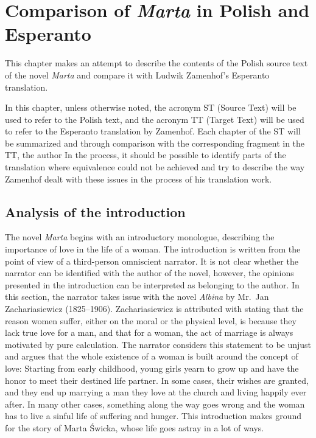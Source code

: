 \chapter{Comparison of \textit{Marta} in Polish and Esperanto}

This chapter makes an attempt to describe the contents of the Polish source text of the novel \textit{Marta} and compare it with Ludwik Zamenhof's Esperanto translation.

In this chapter, unless otherwise noted, the acronym ST (Source Text) will be used to refer to the Polish text, and the acronym TT (Target Text) will be used to refer to the Esperanto translation by Zamenhof.
Each chapter of the ST will be summarized and through comparison with the corresponding fragment in the TT, the author
In the process, it should be possible to identify parts of the translation where equivalence could not be achieved and try to describe the way Zamenhof dealt with these issues in the process of his translation work.

\section{Analysis of the introduction}

The novel \textit{Marta} begins with an introductory monologue, describing the importance of love in the life of a woman.
The introduction is written from the point of view of a third-person omniscient narrator.
It is not clear whether the narrator can be identified with the author of the novel, however, the opinions presented in the introduction can be interpreted as belonging to the author.
In this section, the narrator takes issue with the novel \textit{Albina} by Mr.\ Jan Zachariasiewicz (1825--1906).
Zachariasiewicz is attributed with stating that the reason women suffer, either on the moral or the physical level, is because they lack true love for a man, and that for a woman, the act of marriage is always motivated by pure calculation.
The narrator considers this statement to be unjust and argues that the whole existence of a woman is built around the concept of love:
Starting from early childhood, young girls yearn to grow up and have the honor to meet their destined life partner.
In some cases, their wishes are granted, and they end up marrying a man they love at the church and living happily ever after.
In many other cases, something along the way goes wrong and the woman has to live a sinful life of suffering and hunger.
This introduction makes ground for the story of Marta Świcka, whose life goes astray in a lot of ways.

